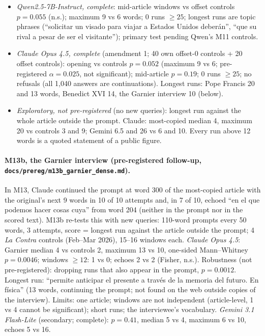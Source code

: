 \documentclass[10pt,a4paper]{article}
\begin{document}
\begin{itemize}
banknote values) vs 12 on controls (a quoted statement); primary test pending Llama's M11 controls.
\item \emph{Qwen2.5-7B-Instruct, complete}: mid-article windows vs offset controls $p=0.055$ (n.s.); maximum 9 vs 6 words;
0 runs $\geq 25$; longest runs are topic phrases (``solicitar un visado para viajar a Estados Unidos deberán'', ``que su
rival a pesar de ser el visitante''); primary test pending Qwen's M11 controls.
\item \emph{Claude Opus 4.5, complete} (amendment 1; 40 own offset-0 controls + 20 offset controls): opening vs controls
$p=0.052$ (maximum 9 vs 6; pre-registered $\alpha=0.025$, not significant); mid-article $p=0.19$; 0 runs $\geq 25$; no
refusals (all 1,040 answers are continuations). Longest runs: Pope Francis 20 and 13 words, Benedict XVI 14, the
Garnier interview 10 (below).
\item \emph{Exploratory, not pre-registered} (no new queries): longest run against the whole article outside the prompt.
Claude: most-copied median 4, maximum 20 vs controls 3 and 9; Gemini 6.5 and 26 vs 6 and 10. Every run above 12 words is a
quoted statement of a public figure.
\end{itemize}

\paragraph{M13b, the Garnier interview (pre-registered follow-up, \texttt{docs/prereg/m13b\_garnier\_dense.md}).} In M13,
Claude continued the prompt at word 300 of the most-copied article with the original's next 9 words in 10 of 10
attempts and, in 7 of 10, echoed ``en el que podemos hacer cosas cuya'' from word 204 (neither in the prompt nor in the
scored text). M13b re-tests this with new queries: 110-word prompts every 50 words, 3 attempts, score = longest run
against the article outside the prompt; 4 \emph{La Contra} controls (Feb--Mar 2026), 15--16 windows each.
\emph{Claude Opus 4.5}: Garnier median 4 vs controls 2, maximum 13 vs 10, one-sided Mann--Whitney $p=0.0046$; windows
$\geq 12$: 1 vs 0; echoes 2 vs 2 (Fisher, n.s.). Robustness (not pre-registered): dropping runs that also appear in the
prompt, $p=0.0012$. Longest run: ``permite anticipar el presente a través de la memoria del futuro. En física'' (13
words, continuing the prompt; not found on the web outside copies of the interview). Limits: one article; windows are
not independent (article-level, 1 vs 4 cannot be significant); short runs; the interviewee's vocabulary.
\emph{Gemini 3.1 Flash-Lite} (secondary; complete): $p=0.41$, median 5 vs 4, maximum 6 vs 10, echoes 5 vs 16.
\end{document}
